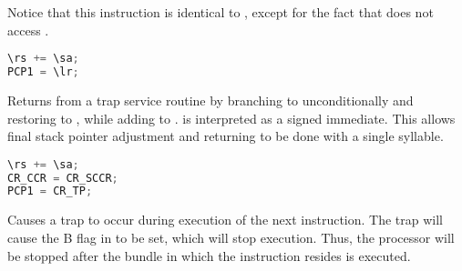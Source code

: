 Notice that this instruction is identical to , except for the fact 
that  does not access \code{\rs}.

\begin{lstlisting}[numbers=none, basicstyle=\ttfamily\footnotesize, language=C++]
\rs += \sa;
PCP1 = \lr;
\end{lstlisting}

Returns from a trap service routine by branching to  unconditionally 
and restoring  to , while adding \code{\sa} to \code{\rs}. 
\code{\sa} is interpreted as a signed immediate. This allows final stack pointer 
adjustment and returning to be done with a single syllable.

\begin{lstlisting}[numbers=none, basicstyle=\ttfamily\footnotesize, language=C++]
\rs += \sa;
CR_CCR = CR_SCCR;
PCP1 = CR_TP;
\end{lstlisting}

Causes a  trap to occur during execution of the next instruction.
The  trap will cause the B flag in  to be set, which will
stop execution. Thus, the processor will be stopped after the bundle in which
the  instruction resides is executed.
